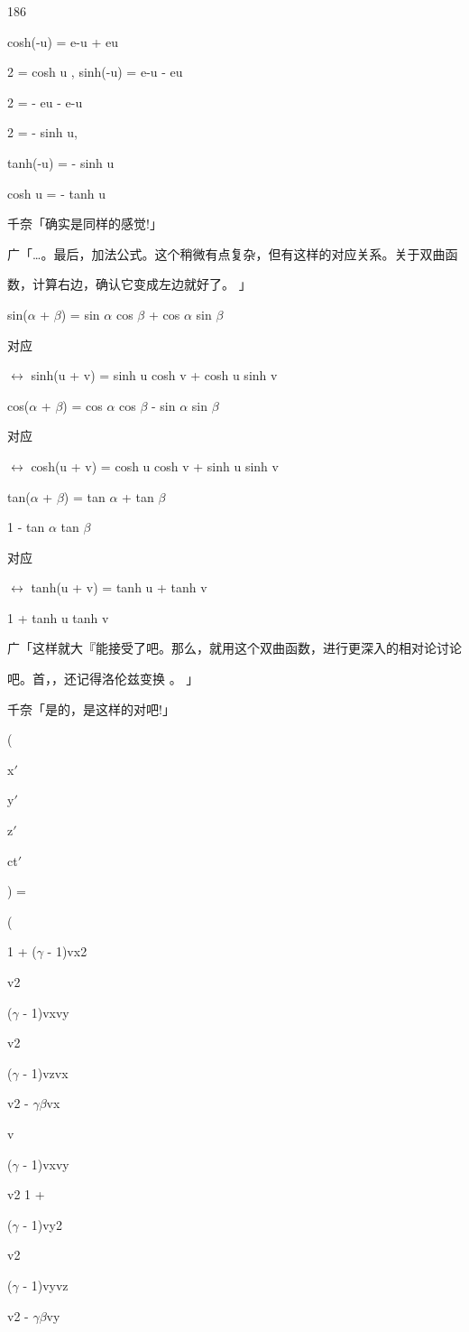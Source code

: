 186\par
cosh(-u) = e-u + eu\par
2 = cosh u , sinh(-u) = e-u - eu\par
2 = - eu - e-u\par
2 = - sinh u,\par
tanh(-u) = - sinh u\par
cosh u = - tanh u\par
千奈「确实是同样的感觉!」\par
广「…。最后，加法公式。这个稍微有点复杂，但有这样的对应关系。关于双曲函\par
数，计算右边，确认它变成左边就好了。 」\par
sin($\alpha$ + $\beta$) = sin $\alpha$ cos $\beta$ + cos $\alpha$ sin $\beta$\par
对应\par
$\leftrightarrow$ sinh(u + v) = sinh u cosh v + cosh u sinh v\par
cos($\alpha$ + $\beta$) = cos $\alpha$ cos $\beta$ - sin $\alpha$ sin $\beta$\par
对应\par
$\leftrightarrow$ cosh(u + v) = cosh u cosh v + sinh u sinh v\par
tan($\alpha$ + $\beta$) = tan $\alpha$ + tan $\beta$\par
1 - tan $\alpha$ tan $\beta$\par
对应\par
$\leftrightarrow$ tanh(u + v) = tanh u + tanh v\par
1 + tanh u tanh v\par
广「这样就大『能接受了吧。那么，就用这个双曲函数，进行更深入的相对论讨论\par
吧。首，，还记得洛伦兹变换 。 」\par
千奈「是的，是这样的对吧!」\par
(\par
x$\prime$\par
y$\prime$\par
z$\prime$\par
ct$\prime$\par
) =\par
(\par
1 + ($\gamma$ - 1)vx2\par
v2\par
($\gamma$ - 1)vxvy\par
v2\par
($\gamma$ - 1)vzvx\par
v2 - $\gamma$$\beta$vx\par
v\par
($\gamma$ - 1)vxvy\par
v2 1 +\par
($\gamma$ - 1)vy2\par
v2\par
($\gamma$ - 1)vyvz\par
v2 - $\gamma$$\beta$vy\par
